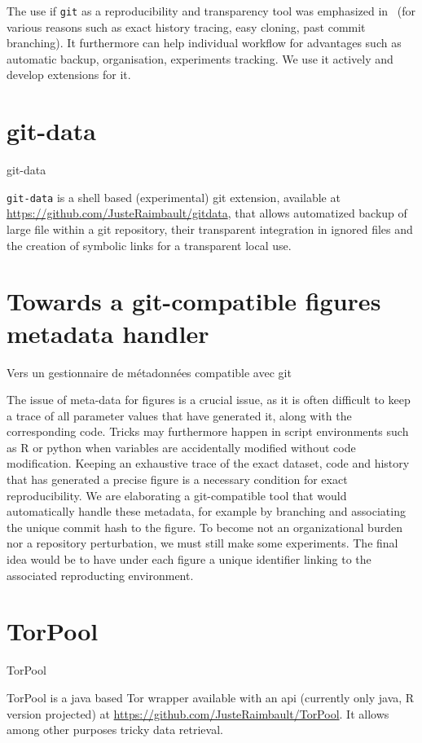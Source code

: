 The use if \texttt{git} as a reproducibility and transparency tool was emphasized in~\cite{ram2013git} (for various reasons such as exact history tracing, easy cloning, past commit branching). It furthermore can help individual workflow for advantages such as automatic backup, organisation, experiments tracking. We use it actively and develop extensions for it.


\section{git-data}{git-data}

\texttt{git-data} is a shell based (experimental) git extension, available at \url{https://github.com/JusteRaimbault/gitdata}, that allows automatized backup of large file within a git repository, their transparent integration in ignored files and the creation of symbolic links for a transparent local use.


\section{Towards a git-compatible figures metadata handler}{Vers un gestionnaire de métadonnées compatible avec git}

The issue of meta-data for figures is a crucial issue, as it is often difficult to keep a trace of all parameter values that have generated it, along with the corresponding code. Tricks may furthermore happen in script environments such as R or python when variables are accidentally modified without code modification. Keeping an exhaustive trace of the exact dataset, code and history that has generated a precise figure is a necessary condition for exact reproducibility. We are elaborating a git-compatible tool that would automatically handle these metadata, for example by branching and associating the unique commit hash to the figure. To become not an organizational burden nor a repository perturbation, we must still make some experiments. The final idea would be to have under each figure a unique identifier linking to the associated reproducting environment.


\section{TorPool}{TorPool}

TorPool is a java based Tor wrapper available with an api (currently only java, R version projected) at \url{https://github.com/JusteRaimbault/TorPool}. It allows among other purposes tricky data retrieval.

